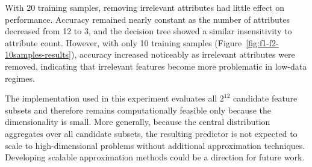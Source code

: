 With 20 training samples, removing irrelevant attributes had little effect on performance.
Accuracy remained nearly constant as the number of attributes decreased from 12 to 3, and the decision tree showed a
similar insensitivity to attribute count.
However, with only 10 training samples (Figure~\ref{fig:f1-f2-10samples-results}),
accuracy increased noticeably as irrelevant attributes were removed, indicating that irrelevant
features become more problematic in low-data regimes.

The implementation used in this experiment evaluates all $2^{12}$ candidate feature subsets and therefore remains
computationally feasible only because the dimensionality is small.
More generally, because the central distribution aggregates over all candidate subsets, the resulting predictor is
not expected to scale to high-dimensional problems without additional approximation techniques.
Developing scalable approximation methods could be a direction for future work.



